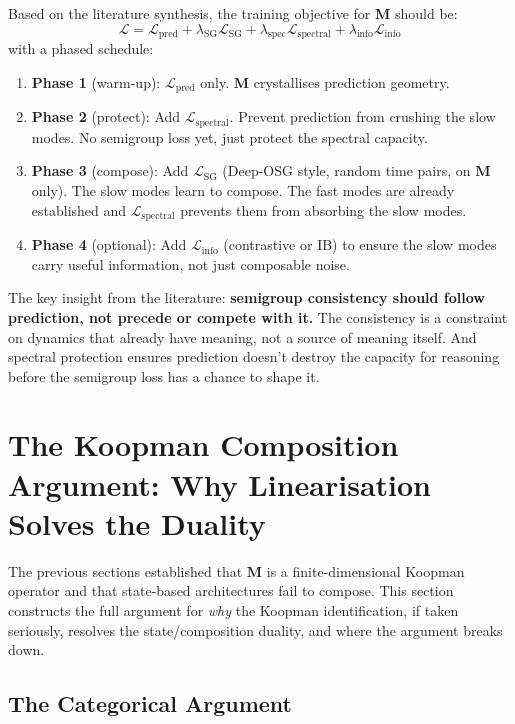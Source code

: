 \documentclass[11pt, a4paper]{article}
\newcommand{\M}{\mathbf{M}}
\theoremstyle{plain}
\theoremstyle{remark}
\begin{document}
Based on the literature synthesis, the training objective for $\M$ should be:
\[
\mathcal{L} = \mathcal{L}_{\text{pred}} + \lambda_{\text{SG}} \mathcal{L}_{\text{SG}} + \lambda_{\text{spec}} \mathcal{L}_{\text{spectral}} + \lambda_{\text{info}} \mathcal{L}_{\text{info}}
\]
with a phased schedule:
\begin{enumerate}[nosep]
    \item \textbf{Phase 1} (warm-up): $\mathcal{L}_{\text{pred}}$ only.  $\M$ crystallises prediction geometry.
    \item \textbf{Phase 2} (protect): Add $\mathcal{L}_{\text{spectral}}$.  Prevent prediction from crushing the slow modes.  No semigroup loss yet, just protect the spectral capacity.
    \item \textbf{Phase 3} (compose): Add $\mathcal{L}_{\text{SG}}$ (Deep-OSG style, random time pairs, on $\M$ only).  The slow modes learn to compose.  The fast modes are already established and $\mathcal{L}_{\text{spectral}}$ prevents them from absorbing the slow modes.
    \item \textbf{Phase 4} (optional): Add $\mathcal{L}_{\text{info}}$ (contrastive or IB) to ensure the slow modes carry useful information, not just composable noise.
\end{enumerate}

The key insight from the literature: \textbf{semigroup consistency should follow prediction, not precede or compete with it.}
The consistency is a constraint on dynamics that already have meaning, not a source of meaning itself.
And spectral protection ensures prediction doesn't destroy the capacity for reasoning before the semigroup loss has a chance to shape it.

\section{The Koopman Composition Argument: Why Linearisation Solves the Duality}\label{sec:koopman-composition}

The previous sections established that $\M$ is a finite-dimensional Koopman operator and that state-based architectures fail to compose.
This section constructs the full argument for \emph{why} the Koopman identification, if taken seriously, resolves the state/composition duality, and where the argument breaks down.

\subsection{The Categorical Argument}
\end{document}
